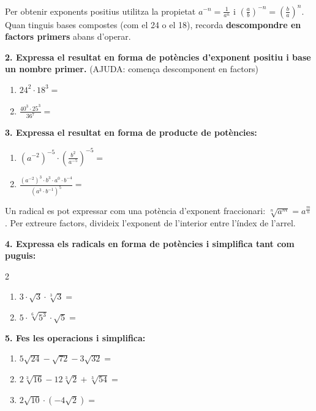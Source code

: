 \documentclass[12pt,a4paper]{article}
\begin{document}
\begin{capsula}
Per obtenir exponents positius utilitza la propietat $a^{-n} = \frac{1}{a^n}$ i $\left(\frac{a}{b}\right)^{-n} = \left(\frac{b}{a}\right)^n$. Quan tinguis bases compostes (com el 24 o el 18), recorda \textbf{descompondre en factors primers} abans d'operar.
\end{capsula}

\textbf{2. Expressa el resultat en forma de potències d’exponent positiu i base un nombre primer.} (AJUDA: comença descomponent en factors)
\begin{enumerate}[label=\alph*)]
    \item $24^2 \cdot 18^3 =$ \vspace{2cm}
    \item $\frac{40^3 \cdot 25^3}{36^7} =$ \vspace{2cm}
\end{enumerate}

\textbf{3. Expressa el resultat en forma de producte de potències:}
\begin{enumerate}[label=\alph*)]
    \item $\left(a^{-2}\right)^{-5} \cdot \left(\frac{b^2}{a^{-5}}\right)^{-5} =$ \vspace{2cm}
    \item $\frac{(a^{-2})^3 \cdot b^3 \cdot a^0 \cdot b^{-4}}{(a^3 \cdot b^{-1})^5} =$ \vspace{2cm}
\end{enumerate}

\begin{capsula}
Un radical es pot expressar com una potència d'exponent fraccionari: $\sqrt[n]{a^m} = a^{\frac{m}{n}}$. Per extreure factors, divideix l'exponent de l'interior entre l'índex de l'arrel.
\end{capsula}

\textbf{4. Expressa els radicals en forma de potències i simplifica tant com puguis:}
\begin{multicols}{2}
\begin{enumerate}[label=\alph*)]
    \item $3 \cdot \sqrt{3} \cdot \sqrt[3]{3} =$ \vspace{2cm}
    \item $5 \cdot \sqrt[6]{5^3} \cdot \sqrt{5} =$ \vspace{2cm}
\end{enumerate}
\end{multicols}

\textbf{5. Fes les operacions i simplifica:} 
\begin{enumerate}[label=\alph*)]
    \item $5\sqrt{24} - \sqrt{72} - 3\sqrt{32} =$ \vspace{1.5cm}
    \item $2\sqrt[3]{16} - 12\sqrt[3]{2} + \sqrt[3]{54} =$ \vspace{1.5cm}
    \item $2\sqrt{10} \cdot \left(-4\sqrt{2}\right) =$ \vspace{1.5cm}
\end{enumerate}
\end{document}
